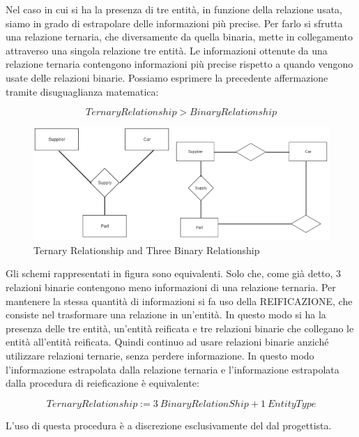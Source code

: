 Nel caso in cui si ha la presenza di tre entità, in funzione della relazione usata, siamo in grado di estrapolare delle informazioni più precise. Per farlo si sfrutta una relazione ternaria, che diversamente da quella binaria, mette in collegamento attraverso una singola relazione tre entità. Le informazioni ottenute da una relazione ternaria contengono informazioni più precise rispetto a quando vengono usate delle relazioni binarie. Possiamo esprimere la precedente affermazione tramite disuguaglianza matematica: 

\[
	TernaryRelationship > BinaryRelationship
\]

\begin{center}
\begin{figure}[H]
\centering
\includegraphics[scale=0.8]{figures/tER2.png}
\caption{Ternary Relationship and Three Binary Relationship} 
\end{figure}
\end{center}

Gli schemi rappresentati in figura sono equivalenti. Solo che, come già detto, 3 relazioni binarie contengono meno informazioni di una relazione ternaria. 
Per mantenere la stessa quantità di informazioni si fa uso della REIFICAZIONE, che consiste nel trasformare una relazione in un’entità. In questo modo si ha la presenza delle tre entità, un’entità reificata e tre relazioni binarie che collegano le entità all’entità reificata.  
Quindi continuo ad usare relazioni binarie anziché utilizzare relazioni ternarie, senza perdere informazione. 
In questo modo l’informazione estrapolata dalla relazione ternaria e l’informazione estrapolata dalla procedura di reieficazione è equivalente: 

\[
	TernaryRelationship := 3\ BinaryRelationShip + 1\ Entity Type
\]

L’uso di questa procedura è a discrezione esclusivamente del dal progettista. 

